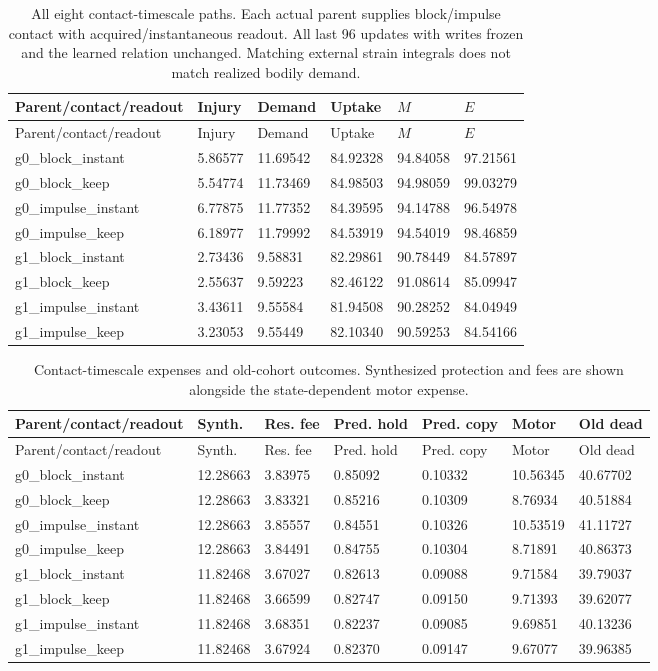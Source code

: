\begin{longtable}{llllll}
\caption{All eight contact-timescale paths. Each actual parent supplies block/impulse contact with acquired/instantaneous readout. All last 96 updates with writes frozen and the learned relation unchanged. Matching external strain integrals does not match realized bodily demand.}\label{tab:maintenance-timing}\\
\toprule
Parent/contact/readout & Injury & Demand & Uptake & $M$ & $E$ \\
\midrule
\endfirsthead
\toprule
Parent/contact/readout & Injury & Demand & Uptake & $M$ & $E$ \\
\midrule
\endhead
g0\_block\_instant & 5.86577 & 11.69542 & 84.92328 & 94.84058 & 97.21561 \\
g0\_block\_keep & 5.54774 & 11.73469 & 84.98503 & 94.98059 & 99.03279 \\
g0\_impulse\_instant & 6.77875 & 11.77352 & 84.39595 & 94.14788 & 96.54978 \\
g0\_impulse\_keep & 6.18977 & 11.79992 & 84.53919 & 94.54019 & 98.46859 \\
g1\_block\_instant & 2.73436 & 9.58831 & 82.29861 & 90.78449 & 84.57897 \\
g1\_block\_keep & 2.55637 & 9.59223 & 82.46122 & 91.08614 & 85.09947 \\
g1\_impulse\_instant & 3.43611 & 9.55584 & 81.94508 & 90.28252 & 84.04949 \\
g1\_impulse\_keep & 3.23053 & 9.55449 & 82.10340 & 90.59253 & 84.54166 \\
\bottomrule
\end{longtable}
\begin{longtable}{lllllll}
\caption{Contact-timescale expenses and old-cohort outcomes. Synthesized protection and fees are shown alongside the state-dependent motor expense.}\label{tab:maintenance-timing-costs}\\
\toprule
Parent/contact/readout & Synth. & Res. fee & Pred. hold & Pred. copy & Motor & Old dead \\
\midrule
\endfirsthead
\toprule
Parent/contact/readout & Synth. & Res. fee & Pred. hold & Pred. copy & Motor & Old dead \\
\midrule
\endhead
g0\_block\_instant & 12.28663 & 3.83975 & 0.85092 & 0.10332 & 10.56345 & 40.67702 \\
g0\_block\_keep & 12.28663 & 3.83321 & 0.85216 & 0.10309 & 8.76934 & 40.51884 \\
g0\_impulse\_instant & 12.28663 & 3.85557 & 0.84551 & 0.10326 & 10.53519 & 41.11727 \\
g0\_impulse\_keep & 12.28663 & 3.84491 & 0.84755 & 0.10304 & 8.71891 & 40.86373 \\
g1\_block\_instant & 11.82468 & 3.67027 & 0.82613 & 0.09088 & 9.71584 & 39.79037 \\
g1\_block\_keep & 11.82468 & 3.66599 & 0.82747 & 0.09150 & 9.71393 & 39.62077 \\
g1\_impulse\_instant & 11.82468 & 3.68351 & 0.82237 & 0.09085 & 9.69851 & 40.13236 \\
g1\_impulse\_keep & 11.82468 & 3.67924 & 0.82370 & 0.09147 & 9.67077 & 39.96385 \\
\bottomrule
\end{longtable}
